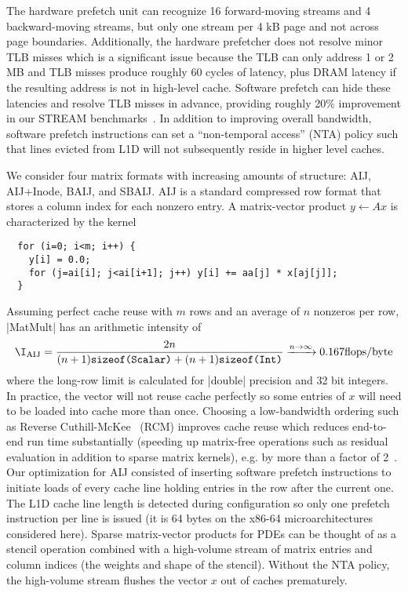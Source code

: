 The hardware prefetch unit can recognize 16 forward-moving streams and 4 backward-moving streams, but only one stream per 4 kB page and not across page boundaries.
Additionally, the hardware prefetcher does not resolve minor TLB misses which is a significant issue because the TLB can only address 1 or 2 MB and TLB misses produce roughly 60 cycles of latency, plus DRAM latency if the resulting address is not in high-level cache.
Software prefetch can hide these latencies and resolve TLB misses in advance, providing roughly 20\% improvement in our STREAM benchmarks~\cite{mccalpin2007stream}.
In addition to improving overall bandwidth, software prefetch instructions can set a ``non-temporal access'' (NTA) policy such that lines evicted from L1D will not subsequently reside in higher level caches.

We consider four matrix formats with increasing amounts of structure: AIJ, AIJ+Inode, BAIJ, and SBAIJ.
AIJ is a standard compressed row format that stores a column index for each nonzero entry.
A matrix-vector product $y \gets A x$ is characterized by the kernel
\begin{verbatim}
  for (i=0; i<m; i++) {
    y[i] = 0.0;
    for (j=ai[i]; j<ai[i+1]; j++) y[i] += aa[j] * x[aj[j]];
  }
\end{verbatim}
Assuming perfect cache reuse with $m$ rows and an average of $n$ nonzeros per row, \cverb|MatMult| has an arithmetic intensity of
\begin{align*}
  \I_{\text{AIJ}} = \frac{2n}{(n+1)\texttt{sizeof(Scalar)} + (n+1)\texttt{sizeof(Int)}} \xrightarrow{n\to\infty} 0.167 \text{flops/byte}
\end{align*}
where the long-row limit is calculated for \cverb|double| precision and 32 bit integers.
In practice, the vector will not reuse cache perfectly so some entries of $x$ will need to be loaded into cache more than once.
Choosing a low-bandwidth ordering such as Reverse Cuthill-McKee~\cite{cuthill1969reducing} (RCM) improves cache reuse which reduces end-to-end run time substantially (speeding up matrix-free operations such as residual evaluation in addition to sparse matrix kernels), e.g. by more than a factor of 2~\cite{gropp2000pmt}.
Our optimization for AIJ consisted of inserting software prefetch instructions to initiate loads of every cache line holding entries in the row after the current one.
The L1D cache line length is detected during configuration so only one prefetch instruction per line is issued (it is 64 bytes on the x86-64 microarchitectures considered here).
Sparse matrix-vector products for PDEs can be thought of as a stencil operation combined with a high-volume stream of matrix entries and column indices (the weights and shape of the stencil).
Without the NTA policy, the high-volume stream flushes the vector $x$ out of caches prematurely.

